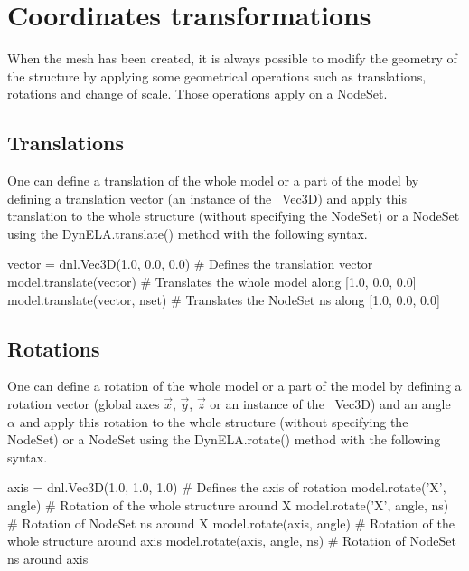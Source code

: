 \section{Coordinates transformations}

When the mesh has been created, it is always possible to modify the
geometry of the structure by applying some geometrical operations
such as translations, rotations and change of scale. Those operations
apply on a \textsf{NodeSet}.

\subsection{Translations}

One can define a translation of the whole model or a part of the model
by defining a translation vector (an instance of the \Dynela~\textsf{Vec3D})
and apply this translation to the whole structure (without specifying
the \textsf{NodeSet}) or a \textsf{NodeSet} using the \textsf{DynELA.translate()}
method with the following syntax.

\begin{PythonListing}
vector = dnl.Vec3D(1.0, 0.0, 0.0) # Defines the translation vector
model.translate(vector)           # Translates the whole model along [1.0, 0.0, 0.0]
model.translate(vector, nset)     # Translates the NodeSet ns along [1.0, 0.0, 0.0]
\end{PythonListing}

\subsection{Rotations}

One can define a rotation of the whole model or a part of the model
by defining a rotation vector (global axes $\overrightarrow{\ensuremath{x}}$,
$\overrightarrow{y}$, $\overrightarrow{\ensuremath{z}}$ or an instance
of the \Dynela~\textsf{Vec3D}) and an angle $\alpha$ and apply
this rotation to the whole structure (without specifying the \textsf{NodeSet})
or a \textsf{NodeSet} using the \textsf{DynELA.rotate()} method with
the following syntax.

\begin{PythonListing}
axis = dnl.Vec3D(1.0, 1.0, 1.0) # Defines the axis of rotation
model.rotate('X', angle)        # Rotation of the whole structure around X
model.rotate('X', angle, ns)    # Rotation of NodeSet ns around X
model.rotate(axis, angle)       # Rotation of the whole structure around axis
model.rotate(axis, angle, ns)   # Rotation of NodeSet ns around axis
\end{PythonListing}

